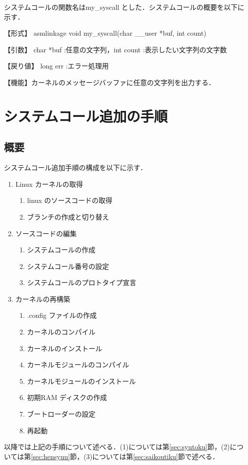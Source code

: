 \documentclass[12pt]{jsarticle}
\begin{document}
システムコールの関数名はmy\_syscall とした．システムコールの概要を以下に示す．

【形式】 asmlinkage void my\_syscall(char \_\_user *buf, int count)

【引数】 char *buf :任意の文字列，int count :表示したい文字列の文字数

【戻り値】 long err :エラー処理用

【機能】カーネルのメッセージバッファに任意の文字列を出力する．

\section{システムコール追加の手順}\label{sec:tejun}
 \subsection{概要}
システムコール追加手順の構成を以下に示す．
\begin{enumerate}
\item Linux カーネルの取得
  \begin{enumerate}
  \item linux のソースコードの取得
  \item ブランチの作成と切り替え
  \end{enumerate}
\item ソースコードの編集
  \begin{enumerate}
  \item システムコールの作成
  \item システムコール番号の設定
  \item システムコールのプロトタイプ宣言
  \end{enumerate}
\item カーネルの再構築
  \begin{enumerate}
  \item .config ファイルの作成
  \item カーネルのコンパイル
  \item カーネルのインストール
  \item カーネルモジュールのコンパイル
  \item カーネルモジュールのインストール
  \item 初期RAM ディスクの作成
  \item ブートローダーの設定
  \item 再起動
  \end{enumerate}
\end{enumerate}
以降では上記の手順について述べる．(1)については第\ref{sec:syutoku}節，(2)については第\ref{sec:hensyuu}節，(3)については第\ref{sec:saikoutiku}節で述べる．
\end{document}

